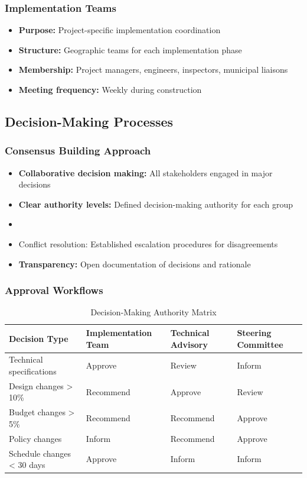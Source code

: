 \documentclass[11pt,letterpaper]{article}
\begin{document}
\subsubsection{Implementation Teams}
\begin{itemize}
    \item \textbf{Purpose:} Project-specific implementation coordination
    \item \textbf{Structure:} Geographic teams for each implementation phase
    \item \textbf{Membership:} Project managers, engineers, inspectors, municipal liaisons
    \item \textbf{Meeting frequency:} Weekly during construction
\end{itemize}

\subsection{Decision-Making Processes}

\subsubsection{Consensus Building Approach}
\begin{itemize}
    \item \textbf{Collaborative decision making:} All stakeholders engaged in major decisions
    \item \textbf{Clear authority levels:} Defined decision-making authority for each group
    \item \item{Conflict resolution:} Established escalation procedures for disagreements
    \item \textbf{Transparency:} Open documentation of decisions and rationale
\end{itemize}

\subsubsection{Approval Workflows}
\begin{table}[h]
\centering
\caption{Decision-Making Authority Matrix}
\begin{tabular}{llll}
\toprule
\textbf{Decision Type} & \textbf{Implementation Team} & \textbf{Technical Advisory} & \textbf{Steering Committee} \\
\midrule
Technical specifications & Approve & Review & Inform \\
Design changes > 10\% & Recommend & Approve & Review \\
Budget changes > 5\% & Recommend & Recommend & Approve \\
Policy changes & Inform & Recommend & Approve \\
Schedule changes < 30 days & Approve & Inform & Inform \\
\bottomrule
\end{tabular}
\end{table}
\end{document}
